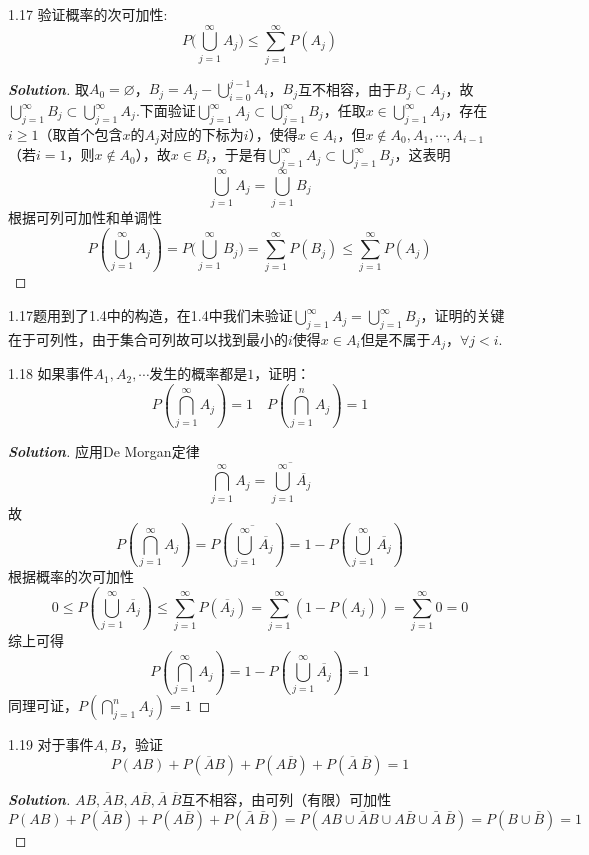 \documentclass[10pt, a4paper, oneside]{ctexart}
\newenvironment{solution}{\begin{proof}[\bf Solution]}{\end{proof}}
\begin{document}
1.17 验证概率的次可加性:
\[P(\bigcup\limits_{j = 1}^\infty  {{A_j}) \leqslant } \sum\limits_{j = 1}^\infty  {P({A_j})} \]
\begin{solution}
取$A_0=\varnothing$，${B_j} = {A_j} - \bigcup\limits_{i = 0}^{j - 1} {{A_i}} $，$B_j$互不相容，由于$B_j\subset A_j$，故$ \bigcup\limits_{j = 1}^\infty  {{B_j}}  \subset \bigcup\limits_{j = 1}^\infty  {{A_j}} $.下面验证$ \bigcup\limits_{j = 1}^\infty  {{A_j}}  \subset \bigcup\limits_{j = 1}^\infty  {{B_j}} $，任取$x\in \bigcup\limits_{j = 1}^\infty  {{A_j}}$，存在$i\geqslant 1$（取首个包含$x$的$A_j$对应的下标为$i$），使得$x\in A_i$，但$x\notin A_0,A_1,\cdots,A_{i-1}$（若$i=1$，则$x\notin A_0$），故$x\in B_i$，于是有$ \bigcup\limits_{j = 1}^\infty  {{A_j}}  \subset \bigcup\limits_{j = 1}^\infty  {{B_j}} $，这表明
\[\bigcup\limits_{j = 1}^\infty  {{A_j}}  = \bigcup\limits_{j = 1}^\infty  {{B_j}}\] 根据可列可加性和单调性
\[
P(\bigcup\limits_{j = 1}^\infty  {{A_j}} ) = P(\bigcup\limits_{j = 1}^\infty  {{B_j})}  = \sum\limits_{j = 1}^\infty  {P({B_j})}  \leqslant \sum\limits_{j = 1}^\infty  {P({A_j})} 
\]
\end{solution}
\begin{remark}
1.17题用到了1.4中的构造，在1.4中我们未验证$\bigcup\limits_{j = 1}^\infty  {{A_j}}  = \bigcup\limits_{j = 1}^\infty  {{B_j}}$，证明的关键在于可列性，由于集合可列故可以找到最小的$i$使得$x\in A_i$但是不属于$A_j$，$\forall j<i$.
\end{remark}


1.18 如果事件$A_1,A_2,\cdots$发生的概率都是$1$，证明：
\[P(\bigcap\limits_{j = 1}^\infty  {{A_j}} ) = 1\quad P(\bigcap\limits_{j = 1}^n {{A_j}} ) = 1\]
\begin{solution}
应用De Morgan定律
\[\bigcap\limits_{j = 1}^\infty  {{A_j}}  = \overline {\bigcup\limits_{j = 1}^\infty  {\overline {{A_j}} } } \]
故
\[P(\bigcap\limits_{j = 1}^\infty  {{A_j}} ) = P(\overline {\bigcup\limits_{j = 1}^\infty  {\overline {{A_j}} } } ) = 1 - P(\bigcup\limits_{j = 1}^\infty  {\overline {{A_j}} } )\]
根据概率的次可加性
\[0 \leqslant P(\bigcup\limits_{j = 1}^\infty  {\overline {{A_j}} } ) \leqslant \sum\limits_{j = 1}^\infty  {P(\overline {{A_j}} )}  = \sum\limits_{j = 1}^\infty  {(1 - P({A_j}))}  = \sum\limits_{j = 1}^\infty  0=0 \]
综上可得
\[P(\bigcap\limits_{j = 1}^\infty  {{A_j}} ) = 1 - P(\bigcup\limits_{j = 1}^\infty  {\overline {{A_j}} } ) = 1\]
同理可证，$P(\bigcap\limits_{j = 1}^n {{A_j}} ) = 1$
\end{solution}

1.19 对于事件$A,B$，验证
\[
P(AB)+P(\overline{A}B)+P(A\overline{B})+P(\overline{A}\:\overline{B})=1
\]
\begin{solution}
$AB,\overline{A}B,A\overline{B},\overline{A}\:\overline{B}$互不相容，由可列（有限）可加性
\[P(AB) + P(\bar AB) + P(A\bar B) + P(\bar A\:\bar B) = P(AB \cup \bar AB \cup A\bar B \cup \bar A\:\bar B) = P(B \cup \bar B) = 1\]
\end{solution}
\end{document}
